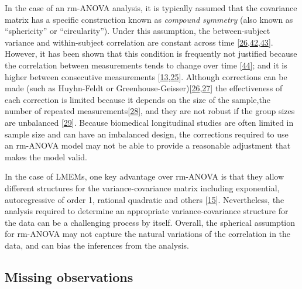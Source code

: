 \documentclass[
]{article}
\begin{document}
In the case of an rm-ANOVA analysis, it is typically assumed that the covariance matrix has a specific construction known as \emph{compound symmetry} (also known as ``sphericity'' or ``circularity''). Under this assumption, the between-subject variance and within-subject correlation are constant across time {[}\protect\hyperlink{ref-huynh1976}{26},\protect\hyperlink{ref-weiss2005}{42},\protect\hyperlink{ref-geisser1958}{43}{]}. However, it has been shown that this condition is frequently not justified because the correlation between measurements tends to change over time {[}\protect\hyperlink{ref-maxwell2017}{44}{]}; and it is higher between consecutive measurements {[}\protect\hyperlink{ref-gueorguieva2004}{13},\protect\hyperlink{ref-ugrinowitsch2004}{25}{]}. Although corrections can be made (such as Huyhn-Feldt or Greenhouse-Geisser){[}\protect\hyperlink{ref-huynh1976}{26},\protect\hyperlink{ref-greenhouse1959}{27}{]} the effectiveness of each correction is limited because it depends on the size of the sample,the number of repeated measurements{[}\protect\hyperlink{ref-haverkamp2017}{28}{]}, and they are not robust if the group sizes are unbalanced {[}\protect\hyperlink{ref-keselman2001}{29}{]}. Because biomedical longitudinal studies are often limited in sample size and can have an imbalanced design, the corrections required to use an rm-ANOVA model may not be able to provide a reasonable adjustment that makes the model valid.

In the case of LMEMs, one key advantage over rm-ANOVA is that they allow different structures for the variance-covariance matrix including exponential, autoregressive of order 1, rational quadratic and others {[}\protect\hyperlink{ref-pinheiro2006}{15}{]}. Nevertheless, the analysis required to determine an appropriate variance-covariance structure for the data can be a challenging process by itself. Overall, the spherical assumption for rm-ANOVA may not capture the natural variations of the correlation in the data, and can bias the inferences from the analysis.

\hypertarget{missing-observations}{%
\subsection{Missing observations}\label{missing-observations}}
\end{document}
